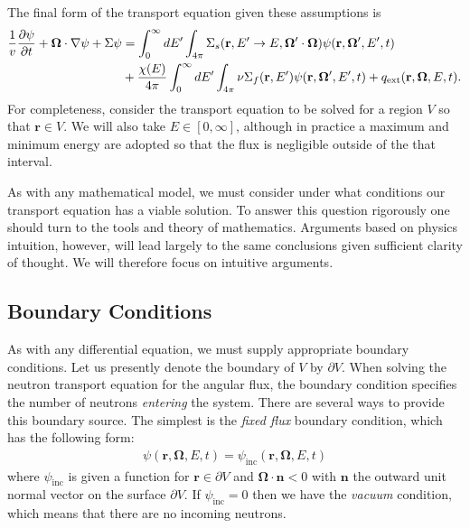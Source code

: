 \documentclass[11pt]{article}
\renewcommand\vec{\mathbf}
\begin{document}
The final form of the transport equation given these assumptions is
\begin{align}
  \frac{1}{v} \frac{\partial\psi}{\partial t}
  + \vec{\Omega} \cdot \nabla\psi
  + \Sigma \psi
  &= \int_0^\infty dE' \int_{4\pi} \Sigma_s(\vec{r},E' \rightarrow E, \vec{\Omega}'\cdot\vec{\Omega}) \psi(\vec{r},\vec{\Omega}',E',t) \notag\\
  &+ \frac{\chi(E)}{4\pi} \int_0^\infty dE' \int_{4\pi} \nu\Sigma_f(\vec{r},E') \psi(\vec{r},\vec{\Omega}',E',t)
  + q_\text{ext}(\vec{r},\vec{\Omega},E,t).
  \label{eq::transportEqn}
\end{align}
For completeness, consider the transport equation to be solved for a region \(V\) so that \(\vec{r} \in V\).  We will also take \(E \in [0, \infty]\), although in practice a maximum and minimum energy are adopted so that the flux is negligible outside of the that interval.

As with any mathematical model, we must consider under what conditions our transport equation has a viable solution.  To answer this question rigorously one should turn to the tools and theory of mathematics.  Arguments based on physics intuition, however, will lead largely to the same conclusions given sufficient clarity of thought.  We will therefore focus on intuitive arguments.

\subsection{Boundary Conditions}
\label{sec:orgheadline5}
As with any differential equation, we must supply appropriate boundary conditions.  Let us presently denote the boundary of \(V\) by \(\partial V\).  When solving the neutron transport equation for the angular flux, the boundary condition specifies the number of neutrons \emph{entering} the system.  There are several ways to provide this boundary source.  The simplest is the \emph{fixed flux} boundary condition, which has the following form:
\begin{align}
  \psi(\vec{r},\vec{\Omega},E,t) = \psi_\text{inc}(\vec{r},\vec{\Omega},E,t)
\end{align}
where \(\psi_\text{inc}\) is given a function for \(\vec{r} \in \partial V\) and \(\vec{\Omega} \cdot \vec{n} < 0\) with \(\vec{n}\) the outward unit normal vector on the surface \(\partial V\).  If \(\psi_\text{inc} = 0\) then we have the \emph{vacuum} condition, which means that there are no incoming neutrons.
\end{document}
